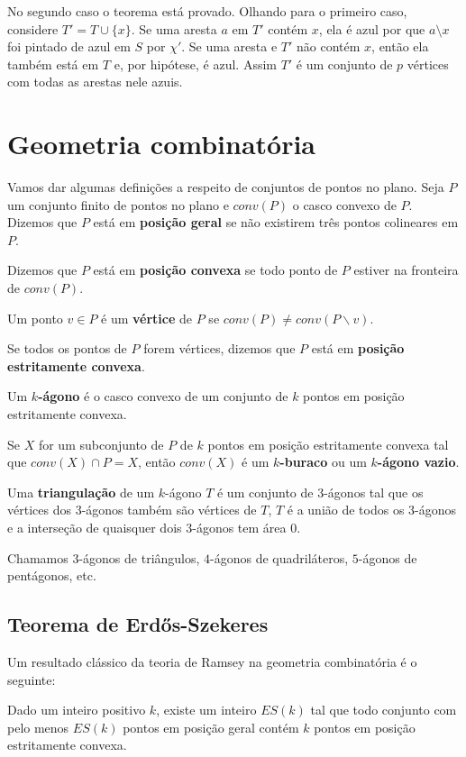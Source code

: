 No segundo caso o teorema está provado. Olhando para o primeiro caso, considere $T'=T\cup\{x\}$. Se uma aresta $a$ em $T'$ contém $x$, ela é azul por que $a\setminus x$ foi pintado de azul em $S$ por $\chi'$. Se uma aresta e $T'$ não contém $x$, então ela também está em $T$ e, por hipótese, é azul. Assim $T'$ é um conjunto de $p$ vértices com todas as arestas nele azuis.

\section{Geometria combinatória}
Vamos dar algumas definições a respeito de conjuntos de pontos no plano. Seja $P$ um conjunto finito de pontos no plano e $conv(P)$ o casco convexo de $P$. Dizemos que $P$ está em \textbf{posição geral} se não existirem três pontos colineares em $P$. 

Dizemos que $P$ está em \textbf{posição convexa} se todo ponto de $P$ estiver na fronteira de $conv(P)$.

Um ponto $v\in P$ é um \textbf{vértice} de $P$ se $conv(P)\neq conv(P\backslash v)$.

Se todos os pontos de $P$ forem vértices, dizemos que $P$ está em \textbf{posição estritamente convexa}.

Um \textbf{$k$-ágono} é o casco convexo de um conjunto de $k$ pontos em posição estritamente convexa.

Se $X$ for um subconjunto de $P$ de $k$ pontos em posição estritamente convexa tal que $conv(X)\cap P=X$, então  $conv(X)$ é um \textbf{$k$-buraco} ou um \textbf{$k$-ágono vazio}.

Uma \textbf{triangulação} de um $k$-ágono $T$ é um conjunto de $3$-ágonos tal que os vértices dos $3$-ágonos também são vértices de $T$, $T$ é a união de todos os $3$-ágonos e a interseção de quaisquer dois $3$-ágonos tem área $0$.

Chamamos $3$-ágonos de triângulos, $4$-ágonos de quadriláteros, $5$-ágonos de pentágonos, etc.

\subsection{Teorema de Erd\H os-Szekeres}
Um resultado clássico da teoria de Ramsey na geometria combinatória é o seguinte:
\begin{teorema}
    Dado um inteiro positivo $k$, existe um inteiro $ES(k)$ tal que todo conjunto com pelo menos $ES(k)$ pontos em posição geral contém $k$ pontos em posição estritamente convexa.
\end{teorema}

